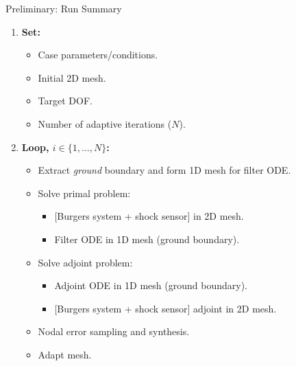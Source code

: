 \documentclass{beamer}
\newcounter{sectionframecount}
\begin{document}

\begin{frame}[t]{Preliminary: Run Summary}

\begin{enumerate}
  \item \textbf{Set:}
  \begin{itemize}
    \item Case parameters/conditions.
    \item Initial 2D mesh.
    \item Target DOF.
    \item Number of adaptive iterations ($N$).
  \end{itemize}
  \item \textbf{Loop, $i \in \{1,...,N\}$:}
  \begin{itemize}
    \item Extract \textit{ground} boundary and form 1D mesh for filter ODE.
    \item Solve primal problem:
    \begin{itemize}
      \item $[$Burgers system + shock sensor$]$ in 2D mesh.
      \item Filter ODE in 1D mesh (ground boundary).
    \end{itemize}
    \item Solve adjoint problem:
    \begin{itemize}
      \item Adjoint ODE in 1D mesh (ground boundary).
      \item $[$Burgers system + shock sensor$]$ adjoint in 2D mesh.
    \end{itemize}
    \item Nodal error sampling and synthesis.
    \item Adapt mesh.
  \end{itemize}
\end{enumerate}


\end{frame}

\end{document}
